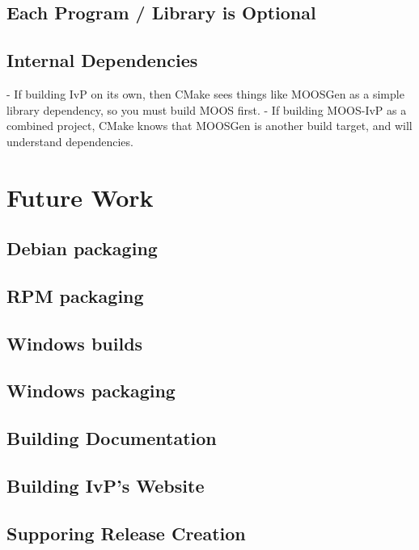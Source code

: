 \documentclass[letterpaper,10pt]{article}
\begin{document}
\subsection{Each Program / Library is Optional}
\subsection{Internal Dependencies}
- If building IvP on its own, then CMake sees things like MOOSGen as
a simple library dependency, so you must build MOOS first.
- If building MOOS-IvP as a combined project, CMake knows that MOOSGen
is another build target, and will understand dependencies.

\section{Future Work}


\subsection{Debian packaging}

\subsection{RPM packaging}

\subsection{Windows builds}

\subsection{Windows packaging}

\subsection{Building Documentation}

\subsection{Building IvP's Website}

\subsection{Supporing Release Creation}
\end{document}
